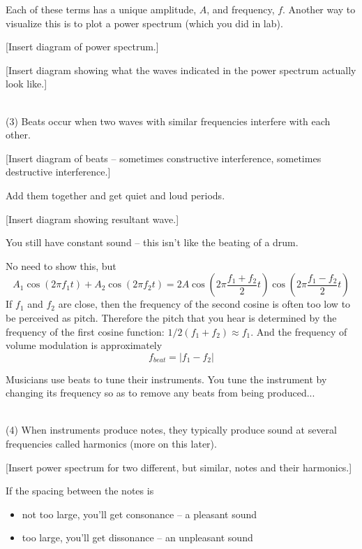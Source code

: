 Each of these terms has a unique amplitude, $A$, and frequency, $f$. Another way to visualize this is to plot a power spectrum (which you did in lab).

[Insert diagram of power spectrum.]
\vspace{5cm}

[Insert diagram showing what the waves indicated in the power spectrum actually look like.]
\vspace{5cm}

\vspace{5cm}

\hrulefill\\
(3) Beats occur when two waves with similar frequencies interfere with each other.

[Insert diagram of beats -- sometimes constructive interference, sometimes destructive interference.]
\vspace{5cm}

Add them together and get quiet and loud periods.

[Insert diagram showing resultant wave.]
\vspace{5cm}

You still have constant sound -- this isn't like the beating of a drum.

No need to show this, but
$$A_1\cos(2\pi f_1 t)+A_2\cos(2\pi f_2 t)=2A\cos\left(2\pi\frac{f_1+f_2}{2}t\right)\cos\left(2\pi\frac{f_1-f_2}{2}t\right)$$
If $f_1$ and $f_2$ are close, then the frequency of the second cosine is often too low to be perceived as pitch. Therefore the pitch that you hear is determined by the frequency of the first cosine function: $1/2(f_1+f_2)\approx f_1$. And the frequency of volume modulation is approximately
$$f_{beat}=|f_1-f_2|$$

Musicians use beats to tune their instruments. You tune the instrument by changing its frequency so as to remove any beats from being produced...

\hrulefill\\
(4) When instruments produce notes, they typically produce sound at several frequencies called harmonics (more on this later).

[Insert power spectrum for two different, but similar, notes and their harmonics.]
\vspace{5cm}

If the spacing between the notes is 
\begin{itemize}
\item not too large, you'll get consonance -- a pleasant sound
\item too large, you'll get dissonance -- an unpleasant sound
\end{itemize}

